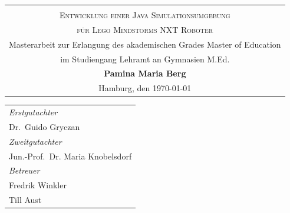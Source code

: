 \begin{titlepage}
\begin{center} 
\vspace{0.5cm} 
\begin{tabular}{c}
 \vspace{1.5cm}\\
\Large \textsc{Entwicklung einer Java Simulationsumgebung}\\
\vspace{0.5cm}
\Large \textsc{für Lego Mindstorms NXT Roboter}\\
\small Masterarbeit zur Erlangung des akademischen Grades Master of Education\\
\vspace{1.25cm}
\small im Studiengang Lehramt an Gymnasien M.Ed.\\
\vspace{1.25cm}
\large \textbf{Pamina Maria Berg}\\
\normalsize Hamburg, den \today
\end{tabular}
\par 
\end{center}
\par
\vspace*{3cm}
\begin{tabular}{l}
\emph{Erstgutachter}\\
Dr.\, Guido Gryczan\\
\emph{Zweitgutachter}\\
Jun.-Prof.\, Dr. Maria Knobelsdorf\\
\emph{Betreuer}\\
Fredrik Winkler\\
Till Aust\\
\end{tabular}

\end{titlepage}
